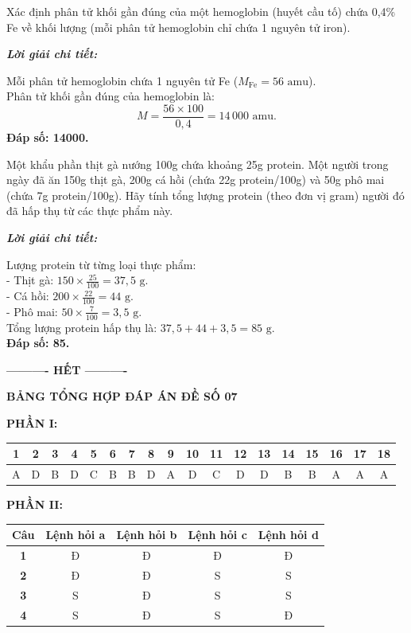 \documentclass[11pt,a4paper]{article}
\def\loigiai#1{
\par\begingroup\color{blue!80!black}\small
\noindent\textbf{\textit{Lời giải chi tiết:}}\par
#1\par\endgroup}
\begin{document}
\begin{ex}
Xác định phân tử khối gần đúng của một hemoglobin (huyết cầu tố) chứa 0,4\% Fe về khối lượng (mỗi phân tử hemoglobin chỉ chứa 1 nguyên tử iron).
\loigiai{
Mỗi phân tử hemoglobin chứa 1 nguyên tử Fe ($M_{\text{Fe}} = 56\text{ amu}$).\\
Phân tử khối gần đúng của hemoglobin là:
$$M = \frac{56 \times 100}{0,4} = 14\,000\text{ amu}.$$
\textbf{Đáp số: 14000.}}
\end{ex}


\begin{ex}
Một khẩu phần thịt gà nướng 100g chứa khoảng 25g protein. Một người trong ngày đã ăn 150g thịt gà, 200g cá hồi (chứa 22g protein/100g) và 50g phô mai (chứa 7g protein/100g). Hãy tính tổng lượng protein (theo đơn vị gram) người đó đã hấp thụ từ các thực phẩm này.
\loigiai{
Lượng protein từ từng loại thực phẩm:\\
- Thịt gà: $150 \times \frac{25}{100} = 37,5\text{ g}$.\\
- Cá hồi: $200 \times \frac{22}{100} = 44\text{ g}$.\\
- Phô mai: $50 \times \frac{7}{100} = 3,5\text{ g}$.\\
Tổng lượng protein hấp thụ là: $37,5 + 44 + 3,5 = 85\text{ g}$.\\
\textbf{Đáp số: 85.}}
\end{ex}


\vspace{0.1cm}
\begin{center}
	\textbf{---------- HẾT ----------}
\end{center}

\vspace{0.3cm}
\noindent
\textbf{\large\color{mainGreen}BẢNG TỔNG HỢP ĐÁP ÁN ĐỀ SỐ 07}

\vspace{0.2cm}
\noindent\textbf{PHẦN I:}\\
\begin{tabular}{|c|c|c|c|c|c|c|c|c|c|c|c|c|c|c|c|c|c|}
\hline
\textbf{1} & \textbf{2} & \textbf{3} & \textbf{4} & \textbf{5} & \textbf{6} & \textbf{7} & \textbf{8} & \textbf{9} & \textbf{10} & \textbf{11} & \textbf{12} & \textbf{13} & \textbf{14} & \textbf{15} & \textbf{16} & \textbf{17} & \textbf{18} \\
\hline
A & D & B & D & C & B & B & D & A & D & C & D & D & B & B & A & A & A \\
\hline
\end{tabular}

\vspace{0.3cm}
\noindent\textbf{PHẦN II:}\\
\begin{tabular}{|c|c|c|c|c|}
\hline
\textbf{Câu} & \textbf{Lệnh hỏi a} & \textbf{Lệnh hỏi b} & \textbf{Lệnh hỏi c} & \textbf{Lệnh hỏi d} \\
\hline
\textbf{1} & Đ & Đ & Đ & Đ \\
\hline
\textbf{2} & Đ & Đ & S & S \\
\hline
\textbf{3} & S & Đ & S & S \\
\hline
\textbf{4} & S & Đ & S & Đ \\
\hline
\end{tabular}
\end{document}
